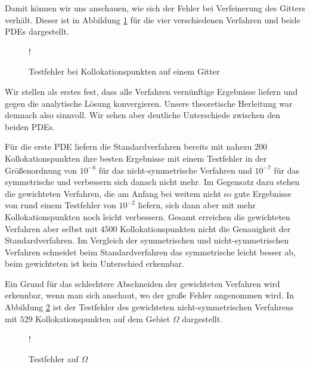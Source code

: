 Damit können wir uns anschauen, wie sich der Fehler bei Verfeinerung des Gitters verhält. Dieser ist in Abbildung \ref{fig:error-grid-both} für die vier verschiedenen Verfahren und beide \acp{PDE} dargestellt. 
%
\begin{figure}[ht]
\centering
\resizebox {\columnwidth} {!} {

}
\caption{Testfehler bei Kollokationspunkten auf einem Gitter}
\label{fig:error-grid-both}
\end{figure}

Wir stellen als erstes fest, dass alle Verfahren vernünftige Ergebnisse liefern und gegen die analytische Lösung konvergieren. Unsere theoretische Herleitung war demnach also sinnvoll. Wir sehen aber deutliche Unterschiede zwischen den beiden \acp{PDE}.

Für die erste \ac{PDE} liefern die Standardverfahren bereits mit nahezu $200$ Kollokationspunkten ihre besten Ergebnisse mit einem Testfehler in der Größenordnung von $10^{-6}$ für das nicht-symmetrische Verfahren und $10^{-7}$ für das symmetrische und verbessern sich danach nicht mehr. Im Gegensatz dazu stehen die gewichteten Verfahren, die am Anfang bei weitem nicht so gute Ergebnisse von rund einem Testfehler von $10^{-2}$ liefern, sich dann aber mit mehr Kollokationspunkten noch leicht verbessern. Gesamt erreichen die gewichteten Verfahren aber selbst mit $4500$ Kollokationspunkten nicht die Genauigkeit der Standardverfahren. Im Vergleich der symmetrischen und nicht-symmetrischen Verfahren schneidet beim Standardverfahren das symmetrische leicht besser ab, beim gewichteten ist kein Unterschied erkennbar.

Ein Grund für das schlechtere Abschneiden der gewichteten Verfahren wird erkennbar, wenn man sich anschaut, wo der große Fehler angenommen wird. In Abbildung \ref{fig:Vergleich} ist der Testfehler des gewichteten nicht-symmetrischen Verfahrens mit $529$ Kollokationspunkten auf dem Gebiet $\Omega$ dargestellt.

\begin{figure}[ht]
\centering
\resizebox {.8\columnwidth} {!} {

}
\caption{Testfehler auf $\Omega$}
\label{fig:Vergleich}
\end{figure}

